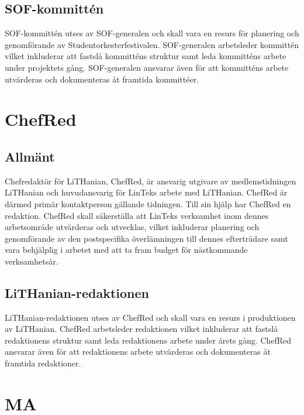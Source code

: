 \hypertarget{sof-kommittuxe9n}{%
\subsection{SOF-kommittén}\label{sof-kommittuxe9n}}

SOF-kommittén utses av SOF-generalen och skall vara en resurs för
planering och genomförande av Studentorkesterfestivalen. SOF-generalen
arbetsleder kommittén vilket inkluderar att fastslå kommitténs struktur
samt leda kommitténs arbete under projektets gång. SOF-generalen
ansvarar även för att kommitténs arbete utvärderas och dokumenteras åt
framtida kommittéer.

\hypertarget{chefred}{%
\section{ChefRed}\label{chefred}}

\hypertarget{allmuxe4nt-8}{%
\subsection{Allmänt}\label{allmuxe4nt-8}}

Chefredaktör för LiTHanian, ChefRed, är ansvarig utgivare av
medlemstidningen LiTHanian och huvudansvarig för LinTeks arbete med
LiTHanian. ChefRed är därmed primär kontaktperson gällande tidningen.
Till sin hjälp har ChefRed en redaktion. ChefRed skall säkerställa att
LinTeks verksamhet inom dennes arbetsområde utvärderas och utvecklas,
vilket inkluderar planering och genomförande av den postspecifika
överlämningen till dennes efterträdare samt vara behjälplig i arbetet
med att ta fram budget för nästkommande verksamhetsår.

\hypertarget{lithanian-redaktionen}{%
\subsection{LiTHanian-redaktionen}\label{lithanian-redaktionen}}

LiTHanian-redaktionen utses av ChefRed och skall vara en resurs i
produktionen av LiTHanian. ChefRed arbetsleder redaktionen vilket
inkluderar att fastslå redaktionens struktur samt leda redaktionens
arbete under årets gång. ChefRed ansvarar även för att redaktionens
arbete utvärderas och dokumenteras åt framtida redaktioner.

\hypertarget{ma}{%
\section{MA}\label{ma}}

